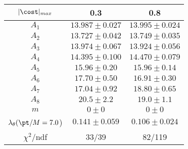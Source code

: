 \begin{tabular}{c|c|c}
$|\cost|_{max}$ & 0.3 & 0.8\\
\hline
$A_1$ & $13.987\pm0.027$ & $13.995\pm0.024$ \\
$A_2$ & $13.727\pm0.042$ & $13.749\pm0.035$ \\
$A_3$ & $13.974\pm0.067$ & $13.924\pm0.056$ \\
$A_4$ & $14.395\pm0.100$ & $14.470\pm0.079$ \\
$A_5$ & $15.96\pm0.20$ & $15.96\pm0.14$ \\
$A_6$ & $17.70\pm0.50$ & $16.91\pm0.30$ \\
$A_7$ & $17.04\pm0.92$ & $18.80\pm0.65$ \\
$A_8$ & $20.5\pm2.2$ & $19.0\pm1.1$ \\
$m$ & $0\pm0$ & $0\pm0$ \\
$\lambda_\theta(\pt/M = 7.0$) & $0.141\pm0.059$ & $0.106\pm0.024$ \\
\hline
$\chi^2$/ndf & 33/39 & 82/119
\end{tabular}
